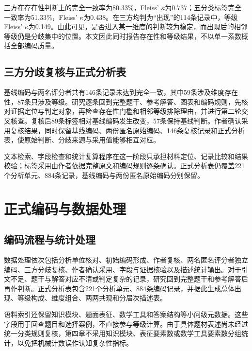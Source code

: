 \documentclass[
  12pt,
  a4paper,twoside,openany]{ctexbook}
\begin{document}
三方在存在性判断上的完全一致率为80.33\%，Fleiss'
\(\kappa\)为0.737；五分类标签完全一致率为51.33\%，Fleiss'
\(\kappa\)为0.438。在三方均判为``出现''的114条记录中，等级Fleiss'
\(\kappa\)为0.149。由此可见，是否进入某一维度的判断较为稳定，而出现后的相邻等级仍是分歧集中的位置。本文因此同时报告存在性和等级结果，不以单一系数概括全部编码质量。

\subsection{三方分歧复核与正式分析表}\label{ux4e09ux65b9ux5206ux6b67ux590dux6838ux4e0eux6b63ux5f0fux5206ux6790ux8868}

基线编码与两名评分者共有146条记录未达到完全一致，其中59条涉及维度存在性，87条只涉及等级。研究逐条回到完整题干、参考解答、图表和编码规则，先核对证据定位与判定对象，再检查存在性门槛和相邻等级排除理由，并进行第二轮交叉核查。复核后89条标签相对基线编码发生改变，57条保持基线判断。作者确认采用复核结果，同时保留基线编码、两份匿名原始编码、146条复核记录和正式分析表，使原始判断、分歧来源与采用值能够相互对应。

文本检索、字段检查和统计复算程序在这一阶段只承担材料定位、记录比较和结果校验；标签采用由作者依据完整原文和编码规则逐条确认。正式分析表仍覆盖221个分析单元、884条记录，基线编码与两份匿名原始编码分别保留。

\section{正式编码与数据处理}\label{ux6b63ux5f0fux7f16ux7801ux4e0eux6570ux636eux5904ux7406}

\subsection{编码流程与统计处理}\label{ux7f16ux7801ux6d41ux7a0bux4e0eux7edfux8ba1ux5904ux7406}

数据处理依次包括分析单位核对、初始编码形成、作者复核、两名匿名评分者独立编码、三方分歧复核、作者确认采用、字段与证据核验以及描述统计输出。对于引文不足、题干与解答对应不清或判定复杂的记录，研究回到完整题干和参考解答后再作判断。正式分析表包含221个分析单元、884条编码记录，并据此生成总体出现、等级构成、维度组合、两两共现和分届次描述表。

语料索引还保留知识模块、题面表征、数学工具和答案结构等小问级元数据。这些字段用于回查题目和选择案例，不直接参与等级计算。由于具体题材表述尚未经过统一分类规则复核，第四章不采用知识模块、表征要素数或数学工具要素数分组统计，以免把机械计数误作认知复杂性指标。
\end{document}
